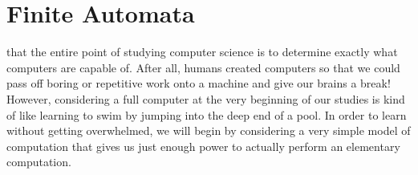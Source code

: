 \section{Finite Automata}\label{sec:finiteautomata}

 that the entire point of studying computer science is to determine exactly what computers are capable of. After all, humans created computers so that we could pass off boring or repetitive work onto a machine and give our brains a break! However, considering a full computer at the very beginning of our studies is kind of like learning to swim by jumping into the deep end of a pool. In order to learn without getting overwhelmed, we will begin by considering a very simple model of computation that gives us just enough power to actually perform an elementary computation.

